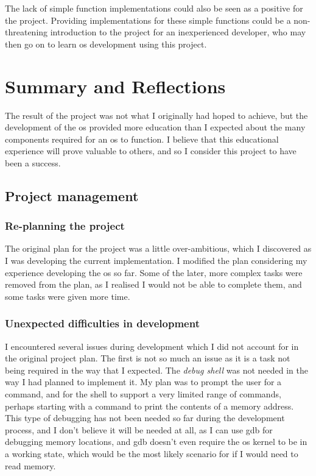 \documentclass{article}
\begin{document}
The lack of simple function implementations could also be seen as a positive
for the project. Providing implementations for these simple functions could be
a non-threatening introduction to the project for an inexperienced developer,
who may then go on to learn \gls{os} development using this project.

\section{Summary and Reflections}
The result of the project was not what I originally had hoped to achieve, but
the development of the \gls{os} provided more education than I expected about
the many components required for an \gls{os} to function. I believe that this
educational experience will prove valuable to others, and so I consider this
project to have been a success.

\subsection{Project management}
\subsubsection{Re-planning the project}
The original plan for the project was a little over-ambitious, which I
discovered as I was developing the current implementation. I modified the
plan considering
my experience developing the \gls{os} so far. Some of the later, more complex
tasks were removed from the plan, as I realised I would not be able
to complete them, and some tasks were given more time.

\subsubsection{Unexpected difficulties in development}
I encountered several issues during development which I did not account
for in the original project plan. The first is not so much an issue as it is a
task not being required in the way that I expected. The \emph{debug shell}
was not needed in the way I had planned to implement it. My plan was to prompt
the user for a command, and for the shell to support a very limited range of
commands, perhaps starting with a command to print the contents of a memory
address. This type of debugging has not been needed so far during the
development process, and I don't believe it will be needed at all, as I can use
\gls{gdb} for debugging memory locations, and \gls{gdb} doesn't even require
the \gls{os} kernel to be in a working state, which would be the most likely
scenario for if I would need to read memory.
\end{document}
